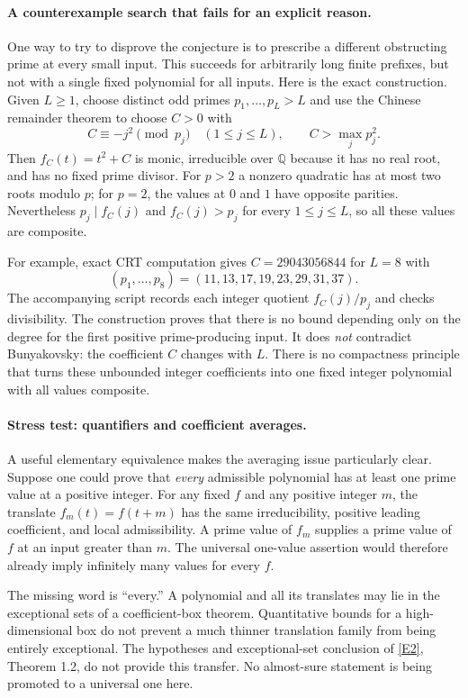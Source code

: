 \documentclass[11pt]{article}
\newcommand{\Q}{\mathbb{Q}}
\newcommand{\eref}[2]{\hyperlink{extra:#1:#2}{[E#2]}}
\begin{document}
\paragraph{A counterexample search that fails for an explicit reason.}
One way to try to disprove the conjecture is to prescribe a different
obstructing prime at every small input. This succeeds for arbitrarily long
finite prefixes, but not with a single fixed polynomial for all inputs.
Here is the exact construction. Given $L\ge1$, choose distinct odd primes
$p_1,\ldots,p_L>L$ and use the Chinese remainder theorem to choose $C>0$
with
\[
 C\equiv-j^2\pmod{p_j}\quad(1\le j\le L),\qquad
 C>\max_j p_j^2.
\]
Then $f_C(t)=t^2+C$ is monic, irreducible over $\Q$ because it has no real
root, and has no fixed prime divisor. For $p>2$ a nonzero quadratic has at
most two roots modulo $p$; for $p=2$, the values at $0$ and $1$ have opposite
parities. Nevertheless $p_j\mid f_C(j)$ and $f_C(j)>p_j$ for every
$1\le j\le L$, so all these values are composite.

For example, exact CRT computation gives $C=29043056844$ for $L=8$ with
\[
 (p_1,\ldots,p_8)=(11,13,17,19,23,29,31,37).
\]
The accompanying script records each integer quotient $f_C(j)/p_j$ and
checks divisibility. The construction proves that there is no bound depending
only on the degree for the first positive prime-producing input. It does
\emph{not} contradict Bunyakovsky: the coefficient $C$ changes with $L$.
There is no compactness principle that turns these unbounded integer
coefficients into one fixed integer polynomial with all values composite.

\paragraph{Stress test: quantifiers and coefficient averages.}
A useful elementary equivalence makes the averaging issue particularly clear.
Suppose one could prove that \emph{every} admissible polynomial has at least
one prime value at a positive integer. For any fixed $f$ and any positive
integer $m$, the translate $f_m(t)=f(t+m)$ has the same irreducibility,
positive leading coefficient, and local admissibility. A prime value of
$f_m$ supplies a prime value of $f$ at an input greater than $m$. The
universal one-value assertion would therefore already imply infinitely many
values for every $f$.

The missing word is ``every.'' A polynomial and all its translates may lie
in the exceptional sets of a coefficient-box theorem. Quantitative bounds
for a high-dimensional box do not prevent a much thinner translation family
from being entirely exceptional. The hypotheses and exceptional-set conclusion
of \eref{102}{2}, Theorem 1.2, do not provide this transfer. No almost-sure
statement is being promoted to a universal one here.
\end{document}

